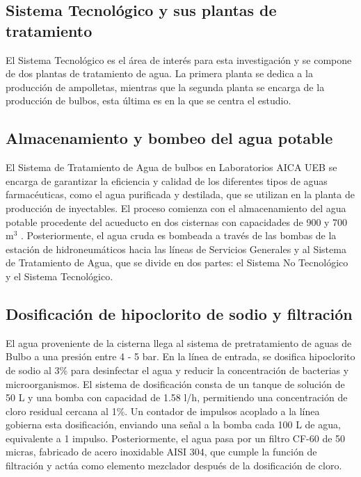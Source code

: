 
\subsection*{Sistema Tecnológico y sus plantas de tratamiento}

El Sistema Tecnológico es el área de interés para esta investigación y se compone de dos plantas de tratamiento de agua.
La primera planta se dedica a la producción de ampolletas, mientras que la segunda planta se encarga de la producción de bulbos, esta última es en la que se centra el estudio.



\subsection*{Almacenamiento y bombeo del agua potable}

El Sistema de Tratamiento de Agua de bulbos en Laboratorios AICA UEB se encarga de garantizar la eficiencia y calidad de los
diferentes tipos de aguas farmacéuticas, como el agua purificada y destilada, que se utilizan en la planta de producción de inyectables.
El proceso comienza con el almacenamiento del agua potable procedente del acueducto en dos cisternas con capacidades de 900 y 700 m$^3$ .
Posteriormente, el agua cruda es bombeada a través de las bombas de la estación de hidroneumáticos hacia las líneas de Servicios Generales y
al Sistema de Tratamiento de Agua, que se divide en dos partes: el Sistema No Tecnológico y el Sistema Tecnológico.


\subsection*{Dosificación de hipoclorito de sodio y filtración}

El agua proveniente de la cisterna llega al sistema de pretratamiento de aguas de Bulbo a una presión entre 4 - 5 bar. En la línea de entrada, se
dosifica hipoclorito de sodio al 3\% para desinfectar el agua y reducir la concentración de bacterias y microorganismos. El sistema de dosificación consta de un
tanque de solución de 50 L y una bomba con capacidad de 1.58 l/h, permitiendo una concentración de cloro residual cercana al 1\%.
Un contador de impulsos acoplado a la línea gobierna esta dosificación, enviando una señal a la bomba cada 100 L de agua, equivalente a 1
impulso. Posteriormente, el agua pasa por un filtro CF-60 de 50 micras, fabricado de acero inoxidable AISI 304, que cumple la función de
filtración y actúa como elemento mezclador después de la dosificación de cloro.

